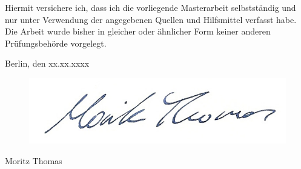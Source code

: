 
Hiermit versichere ich, dass ich die vorliegende Masterarbeit selbstständig und nur unter
Verwendung der angegebenen Quellen und Hilfsmittel verfasst habe. Die Arbeit wurde bisher
in gleicher oder ähnlicher Form keiner anderen Prüfungsbehörde vorgelegt.

\vskip 1cm

Berlin, den xx.xx.xxxx

\begin{figure}[ht]
	\includegraphics[scale=0.5]{resources/images/Unterschrift Kopie.jpg}
\end{figure}

Moritz Thomas